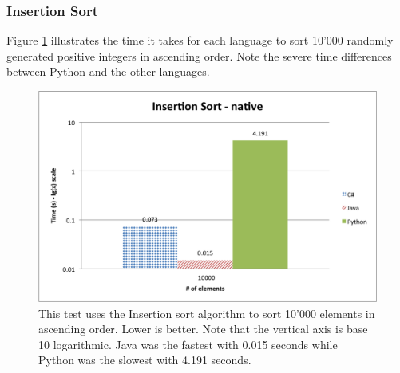 \subsubsection{Insertion Sort}

Figure \ref{fig:native_insertion_sort} illustrates the time it takes for each language to sort 10'000 randomly generated positive integers in ascending order. Note the severe time differences between Python and the other languages.

\begin{figure}[h]
	\centering
	\includegraphics[width=1.0\linewidth]{chapters/new_media/InsertionSortNative.png}
	\caption{This test uses the Insertion sort algorithm to sort 10'000 elements in ascending order. Lower is better. Note that the vertical axis is base 10 logarithmic. Java was the fastest with 0.015 seconds while Python was the slowest with 4.191 seconds. }
	\label{fig:native_insertion_sort}
\end{figure}
